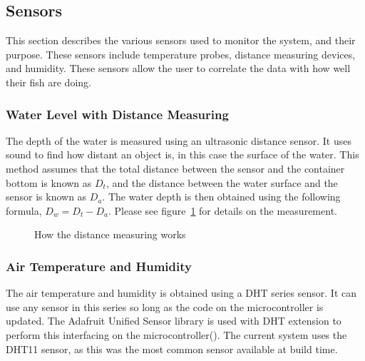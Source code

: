 \documentclass[american,12pt]{article}
\begin{document}
\subsection{Sensors}
This section describes the various sensors used to monitor the system, and their
purpose. These sensors include temperature probes, distance measuring devices,
and humidity. These sensors allow the user to correlate the data with how well
their fish are doing.

\subsubsection{Water Level with Distance Measuring}
The depth of the water is measured using an ultrasonic distance sensor. It uses
sound to find how distant an object is, in this case the surface of the water.
This method assumes that the total distance between the sensor and the container
bottom is known as $D_t$, and the distance between the water surface and the sensor
is known as $D_a$. The water depth is then obtained using the following formula,
$D_w = D_t - D_a$. Please see figure~\ref{fig:distance measuring} for details on the
measurement.

\begin{figure}[h]
    \centering
    \caption{How the distance measuring works}
    \label{fig:distance measuring}
\end{figure}

\subsubsection{Air Temperature and Humidity}
The air temperature and humidity is obtained using a DHT series sensor. It can
use any sensor in this series so long as the code on the microcontroller is
updated. The Adafruit Unified Sensor library is used with DHT extension to
perform this interfacing on the
microcontroller(\cite{adafruit-unified-sensor,adafruit-dht}). The current system
uses the DHT11 sensor, as this was the most common sensor available at build
time.
\end{document}
